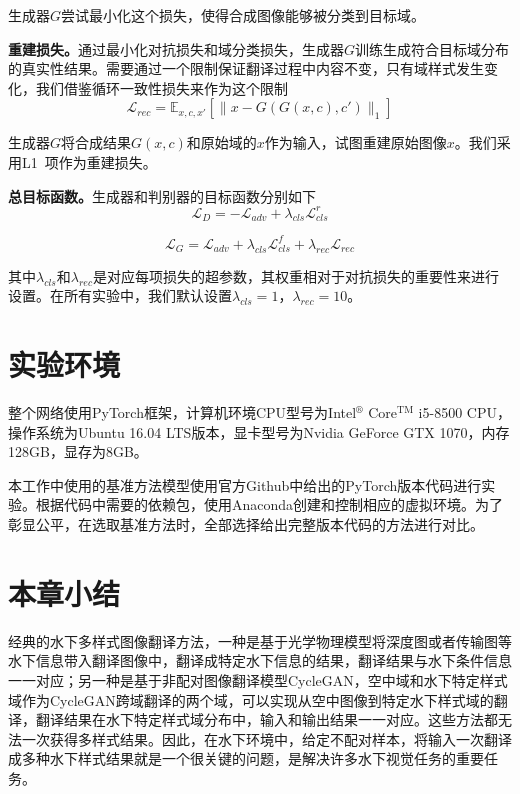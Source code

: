 生成器$G$尝试最小化这个损失，使得合成图像能够被分类到目标域。

\textbf{重建损失。}通过最小化对抗损失和域分类损失，生成器$G$训练生成符合目标域分布的真实性结果。需要通过一个限制保证翻译过程中内容不变，只有域样式发生变化，我们借鉴循环一致性损失来作为这个限制
\begin{equation}
\label{equ:rec_exp2}
\mathcal{L}_{rec} = \mathbb{E}_{x,c,x'}[\| x-G(G(x,c),c') \|_1]
\end{equation}

生成器$G$将合成结果$G(x,c)$和原始域的$x$作为输入，试图重建原始图像$x$。我们采用L1~\cite{shrivastava2017learning}项作为重建损失。

\textbf{总目标函数。}生成器和判别器的目标函数分别如下
\begin{equation}
\label{equ:D_exp2}
\mathcal{L}_{D} = -\mathcal{L}_{adv} + \lambda_{cls}\mathcal{L}_{cls}^{r}
\end{equation}

\begin{equation}
\label{equ:G_exp2}
\mathcal{L}_{G} = \mathcal{L}_{adv}+\lambda_{cls}\mathcal{L}_{cls}^{f}+\lambda_{rec}\mathcal{L}_{rec}
\end{equation}

其中$\lambda_{cls}$和$\lambda_{rec}$是对应每项损失的超参数，其权重相对于对抗损失的重要性来进行设置。在所有实验中，我们默认设置$\lambda_{cls}=1$，$\lambda_{rec}=10$。


\section{实验环境}
整个网络使用PyTorch框架，计算机环境CPU型号为Intel$^\circledR$ Core$^{\text{TM}}$ i5-8500 CPU，操作系统为Ubuntu 16.04 LTS版本，显卡型号为Nvidia GeForce GTX 1070，内存128GB，显存为8GB。

本工作中使用的基准方法模型使用官方Github中给出的PyTorch版本代码进行实验。根据代码中需要的依赖包，使用Anaconda创建和控制相应的虚拟环境。为了彰显公平，在选取基准方法时，全部选择给出完整版本代码的方法进行对比。

\section{本章小结}
经典的水下多样式图像翻译方法，一种是基于光学物理模型将深度图或者传输图等水下信息带入翻译图像中，翻译成特定水下信息的结果，翻译结果与水下条件信息一一对应；另一种是基于非配对图像翻译模型CycleGAN，空中域和水下特定样式域作为CycleGAN跨域翻译的两个域，可以实现从空中图像到特定水下样式域的翻译，翻译结果在水下特定样式域分布中，输入和输出结果一一对应。这些方法都无法一次获得多样式结果。因此，在水下环境中，给定不配对样本，将输入一次翻译成多种水下样式结果就是一个很关键的问题，是解决许多水下视觉任务的重要任务。

